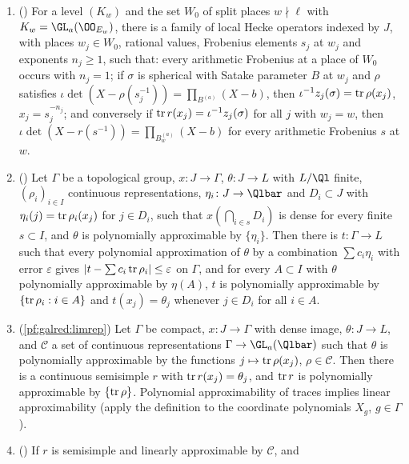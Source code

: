\begin{enumerate}[label=(\roman*),nosep]
\item () For a level $(K_w)$ and the set $W_0$ of split places $w\nmid\ell$ with
  $K_w=\GL_a(\OO_{E_w})$, there is a family of local Hecke operators indexed by $J$, with places $w_j\in W_0$, rational
  values, Frobenius elements $s_j$ at $w_j$ and exponents $n_j\ge1$, such that: every arithmetic Frobenius at a place of
  $W_0$ occurs with $n_j=1$; if $\sigma$ is spherical with Satake parameter $B$ at $w_j$ and $\rho$ satisfies
  $\iota\det(X-\rho(s_j^{-1}))=\prod_{B^{(a)}}(X-b)$, then $\iota^{-1}z_j(\sigma)=\operatorname{tr}\rho(x_j)$, $x_j=s_j^{-n_j}$; and conversely
  if $\operatorname{tr} r(x_j)=\iota^{-1}z_j(\sigma)$ for all $j$ with $w_j=w$, then $\iota\det(X-r(s^{-1}))=\prod_{B^{(a)}_w}(X-b)$ for every
  arithmetic Frobenius $s$ at $w$.
\item () Let $\Gamma$ be a topological group, $x\colon J\to\Gamma$,
  $\theta\colon J\to L$ with $L/\Ql$ finite, $(\rho_i)_{i\in I}$ continuous representations, $\eta_i\colon J\to\Qlbar$ and
  $D_i\subset J$ with $\eta_i(j)=\operatorname{tr}\rho_i(x_j)$ for $j\in D_i$, such that $x(\bigcap_{i\in s}D_i)$ is dense for every finite
  $s\subset I$, and $\theta$ is polynomially approximable by $\{\eta_i\}$. Then there is $t\colon\Gamma\to L$ such that
  every polynomial approximation of $\theta$ by a combination $\sum c_i\eta_i$ with error $\varepsilon$ gives
  $|t-\sum c_i\operatorname{tr}\rho_i|\le\varepsilon$ on $\Gamma$, and for every $A\subset I$ with $\theta$ polynomially approximable by
  $\eta(A)$, $t$ is polynomially approximable by $\{\operatorname{tr}\rho_i:i\in A\}$ and $t(x_j)=\theta_j$ whenever $j\in D_i$ for all
  $i\in A$.
\item (\cref{pf:galred:limrep}) Let $\Gamma$ be compact, $x\colon J\to\Gamma$ with dense image,
  $\theta\colon J\to L$, and $\mathcal C$ a set of continuous representations $\Gamma\to\GL_a(\Qlbar)$ such that $\theta$ is
  polynomially approximable by the functions $j\mapsto\operatorname{tr}\rho(x_j)$, $\rho\in\mathcal C$. Then there is a continuous
  semisimple $r$ with $\operatorname{tr} r(x_j)=\theta_j$, and $\operatorname{tr} r$ is polynomially approximable by $\{\operatorname{tr}\rho\}$.
  Polynomial approximability of traces implies linear approximability (apply the definition to the coordinate polynomials
  $X_g$, $g\in\Gamma$).
\item () If $r$ is semisimple and linearly approximable by $\mathcal C$, and

\end{enumerate}
